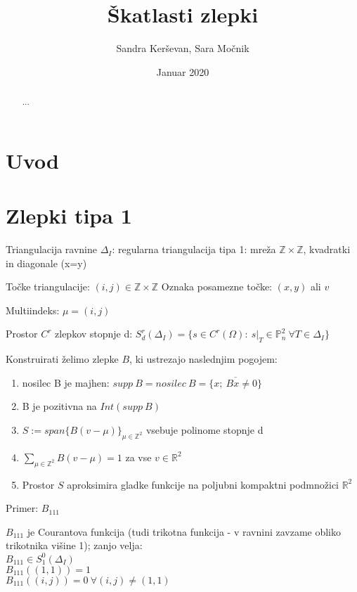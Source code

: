 \documentclass[12pt]{article}
\title{Škatlasti zlepki}
\author{Sandra Kerševan, Sara Močnik}
\date{Januar 2020}
\begin{document}
\maketitle


\begin{abstract}
...
\end{abstract}

\section{Uvod}

\section{Zlepki tipa 1}
Triangulacija ravnine $\Delta_I$: 
regularna triangulacija tipa 1: mreža $\mathbb{Z} \times \mathbb{Z}$, kvadratki in diagonale (x=y)

Točke triangulacije: $(i, j) \in \mathbb{Z} \times \mathbb{Z}$
Oznaka posamezne točke: $(x,y)$ ali $v$

Multiindeks: $\mu = (i,j)$

Prostor $C^r$ zlepkov stopnje d: $S_d^r(\Delta_I) = \{ s \in C^r(\Omega):\ s|_T \in \mathbb{P}_n^2\  \forall T \in  \Delta_I\}$

Konstruirati želimo zlepke $B$, ki ustrezajo naslednjim pogojem:
\begin{enumerate}
\item nosilec B je majhen: $supp\ B = nosilec\ B = \overline{\{x;\ Bx \neq 0\}}$
\item B je pozitivna na $Int(supp\ B)$
\item $S := span \{ B(v-\mu)  \}_{\mu \in \mathbb{Z}^2}$ vsebuje polinome stopnje d
\item $\sum_{\mu \in \mathbb{Z}^2} B(v-\mu)  = 1$ za vse $v \in \mathbb{R}^2$
\item Prostor $S$ aproksimira gladke funkcije na poljubni kompaktni podmnožici $\mathbb{R}^2$
\end{enumerate}

Primer: $B_{111}$

$B_{111}$ je Courantova funkcija (tudi trikotna funkcija - v ravnini zavzame obliko trikotnika višine 1); zanjo velja:  \\
$B_{111} \in S_1^0(\Delta_I)$\\
$B_{111} ((1,1)) = 1$\\
$B_{111} ((i,j)) = 0\ \forall (i,j) \neq (1,1)$
\\
\\
\end{document}
